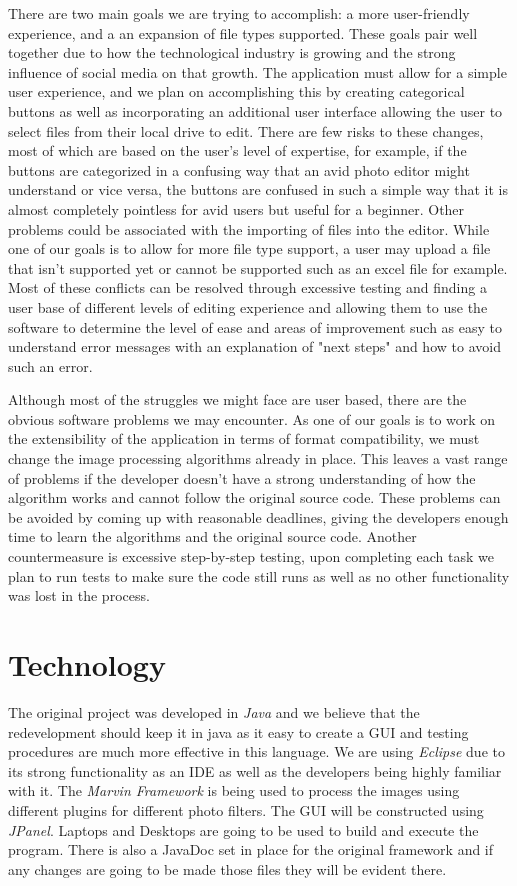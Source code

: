 \documentclass{article}
\begin{document}
\newpage


There are two main goals we are trying to accomplish: a more user-friendly experience, and a an expansion of file types supported. These goals pair well together due to how the technological industry is growing and the strong influence of social media on that growth. The application must allow for a simple user experience, and we plan on accomplishing this by creating categorical buttons as well as incorporating an additional user interface allowing the user to select files from their local drive to edit. There are few risks to these changes, most of which are based on the user's level of expertise, for example, if the buttons are categorized in a confusing way that an avid photo editor might understand or vice versa, the buttons are confused in such a simple way that it is almost completely pointless for avid users but useful for a beginner. Other problems could be associated with the importing of files into the editor. While one of our goals is to allow for more file type support, a user may upload a file that isn't supported yet or cannot be supported such as an excel file for example. Most of these conflicts can be resolved through excessive testing and finding a user base of different levels of editing experience and allowing them to use the software to determine the level of ease and areas of improvement such as easy to understand error messages with an explanation of "next steps" and how to avoid such an error.

Although most of the struggles we might face are user based, there are the obvious software problems we may encounter. As one of our goals is to work on the extensibility of the application in terms of format compatibility, we must change the image processing algorithms already in place. This leaves a vast range of problems if the developer doesn't have a strong understanding of how the algorithm works and cannot follow the original source code. These problems can be avoided by coming up with reasonable deadlines, giving the developers enough time to learn the algorithms and the original source code. Another countermeasure is excessive step-by-step testing, upon completing each task we plan to run tests to make sure the code still runs as well as no other functionality was lost in the process.

\section{Technology}
The original project was developed in \textit{Java} and we believe that the redevelopment should keep it in java as it easy to create a GUI and testing procedures are much more effective in this language. We are using \textit{Eclipse} due to its strong functionality as an IDE as well as the developers being highly familiar with it. The \textit{Marvin Framework}  is being used to process the images using different plugins for different photo filters. The GUI will be constructed using \textit{JPanel}. Laptops and Desktops are going to be used to build and execute the program. There is also a JavaDoc set in place for the original framework and if any changes are going to be made those files they will be evident there.
\end{document}
